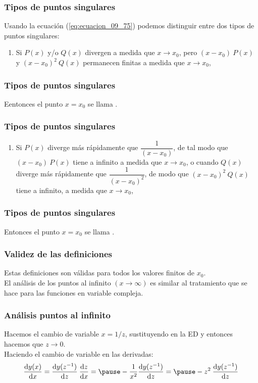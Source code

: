 \documentclass[12pt]{beamer}
\begin{document}
\begin{frame}
\frametitle{Tipos de puntos singulares}
Usando la ecuación (\ref{eq:ecuacion_09_75}) podemos distinguir entre dos tipos de puntos singulares:
\pause
{}
\begin{enumerate}[<+->]
\item Si $P (x)$ y/o $Q (x)$ divergen a medida que $x \to x_{0}$, pero $(x - x_{0}) \: P (x)$ y $(x - x_{0})^{2} \: Q (x)$ permanecen finitas a medida que $x \to x_{0}$,
\seti
\end{enumerate}
\end{frame}
\begin{frame}
\frametitle{Tipos de puntos singulares}
Eentonces el punto $x = x_{0}$ se llama .
\end{frame}
\begin{frame}
\frametitle{Tipos de puntos singulares}
\begin{enumerate}[<+->]
\conti 
\item Si $P (x)$ diverge más rápidamente que $\dfrac{1}{(x - x_{0})}$, de tal modo que $(x - x_{0}) \: P (x)$ tiene a infinito a medida que $x \to x_{0}$, o cuando $Q (x)$ diverge más rápidamente que $\dfrac{1}{(x - x_{0})^{2}}$, de modo que $(x - x_{0})^{2} \: Q (x)$ tiene a infinito, a medida que $x \to x_{0}$,
\end{enumerate}
\end{frame}
\begin{frame}
\frametitle{Tipos de puntos singulares}
Entonces el punto $x = x_{0}$ se llama .
\end{frame}
\begin{frame}
\frametitle{Validez de las definiciones}
Estas definiciones son válidas para todos los valores finitos de $x_{0}$. 
\\
\bigskip
\pause
El análisis de los puntos al infinito $(x \to \infty)$ es similar al tratamiento que se hace para las funciones en variable compleja.
\end{frame}
\begin{frame}
\frametitle{Análisis puntos al infinito}
Hacemos el cambio de variable $x = 1/z$, sustituyendo en la ED y entonces hacemos que $z \to 0$. 
\\
\bigskip
\pause
Haciendo el cambio de variable en las derivadas:
\begin{eqnarray}
\dv{y(x)}{x} = \dv{y(z^{-1})}{z} \: \dv{z}{x} = \pause - \dfrac{1}{x^{2}} \dv{y(z^{-1})}{z} = \pause -z^{2} \: \dv{y(z^{-1})}{z}
\label{eq:ecuacion_09_76}
\end{eqnarray}
\end{frame}
\end{document}
